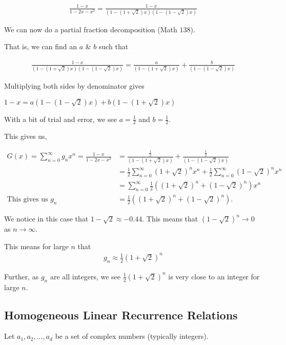 \documentclass{article}
\begin{document}
\begin{align*}
    \frac{1-x}{1-2x-x^2} = \frac{1-x}{(1-(1+\sqrt{2})x)(1-(1-\sqrt{2})x)}
\end{align*}

We can now do a partial fraction decomposition (Math $138$).

That is, we can find an $a$ \& $b$ such that

\begin{align*}
    \frac{1-x}{(1-(1+\sqrt{2})x)(1-(1-\sqrt{2})x)} = \frac{a}{(1-(1+\sqrt{2})x)} + \frac{b}{(1-(1-\sqrt{2})x)}
\end{align*}

Multiplying both sides by denominator gives 

$1-x = a(1-(1-\sqrt{2})x) + b(1-(1+\sqrt{2})x)$

With a bit of trial and error, we see $a = \frac{1}{2}$ and $b = \frac{1}{2}$.

This gives us,

\begin{align*}
    G(x) = \sum_{n=0}^{\infty}g_nx^n = \frac{1-x}{1-2x-x^2} &= \frac{\frac{1}{2}}{(1-(1+\sqrt{2})x)} + \frac{\frac{1}{2}}{(1-(1-\sqrt{2})x)} \\ 
    &= \frac{1}{2} \sum_{n=0}^{\infty}(1+\sqrt{2})^n x^n + \frac{1}{2} \sum_{n=0}^{\infty}(1-\sqrt{2})^n x^n \\
    &= \sum_{n=0}^{\infty} \frac{1}{2} ((1+\sqrt{2})^n + (1-\sqrt{2})^n)x^n \\ 
    \text{This gives us } g_n &= \frac{1}{2}((1+\sqrt{2})^n + (1-\sqrt{2})^n).
\end{align*}

We notice in this case that $1-\sqrt{2} \approx -0.44$. This means that $(1-\sqrt{2})^n \to 0$ as $n \to \infty$. 

This means for large $n$ that
\begin{align*}
    g_n \approx \frac{1}{2}(1+\sqrt{2})^n
\end{align*}

Further, as $g_n$ are all integers, we see $\frac{1}{2}(1+\sqrt{2})^n$ is very close to an integer for large $n$. 

\subsection{Homogeneous Linear Recurrence Relations}

Let $a_1, a_2, \ldots, a_d$ be a set of complex numbers (typically integers). 
\end{document}
